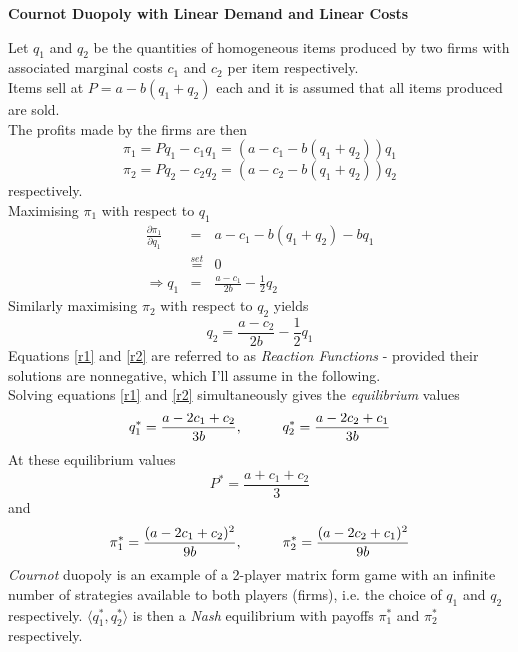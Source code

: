 \documentclass[12pt]{article}
\begin{document}
\begin{center}
\textbf{Cournot Duopoly with Linear Demand and Linear Costs %
}
\end{center}
Let $q_1$ and $q_2$ be the quantities of homogeneous items produced by two firms with associated marginal costs $c_1$ and $c_2$ per item respectively.\\
Items sell at $P = a - b(q_1+q_2)$ each and it is assumed that all items produced are sold. \\ The profits made by the firms are then
$$ \pi_1 = P q_1 - c_1 q_1 = \left(a-c_1 - b(q_1+q_2)\right)q_1$$
$$ \pi_2 = P q_2 - c_2 q_2 = \left(a-c_2 - b(q_1+q_2)\right)q_2$$
respectively.\\
Maximising $\pi_1$ with respect to $q_1$
\begin{eqnarray}
 \frac{\partial \pi_1} {\partial q_1} &=& a-c_1 - b(q_1+q_2) - bq_1 \nonumber \\
 & \stackrel{set}{=} & 0 \nonumber \\
 \Rightarrow q_1 &=& \frac{a-c_1}{2b} - \frac{1}{2} q_2 \label{r1}
 \end{eqnarray}
 Similarly maximising $\pi_2$ with respect to $q_2$ yields
 \begin{equation} q_2 = \frac{a-c_2}{2b} - \frac{1}{2} q_1 \label{r2} \end{equation}
 Equations \ref{r1} and \ref{r2} are referred to as \textit{Reaction Functions} -  provided their solutions are nonnegative, which I'll assume in the following.\\
 Solving equations \ref{r1} and \ref{r2} simultaneously gives the \textit{equilibrium} values
 $$ q_1^* = \frac{a - 2c_1 + c_2}{3b}, \hspace{10mm} q_2^* = \frac{a - 2c_2 + c_1}{3b} $$
 At these equilibrium values
 $$ P^* = \frac{a+c_1+c_2}{3} $$
 and
 \begin{equation} \pi_1^* = \frac{(a-2c_1+ c_2)^2}{9b}, \hspace{10mm} \pi_2^* = \frac{(a-2c_2+ c_1)^2}{9b}\label{cp} \end{equation}
 \textit{Cournot} duopoly is an example of a 2-player matrix form game with an infinite number of strategies available to both players (firms), i.e. the choice of $q_1$ and $q_2$ respectively. $\langle q_1^*, q_2^* \rangle $ is then a \textit{Nash} equilibrium with payoffs $ \pi_1^*$ and $\pi_2^*$ respectively.\\
\end{document}
